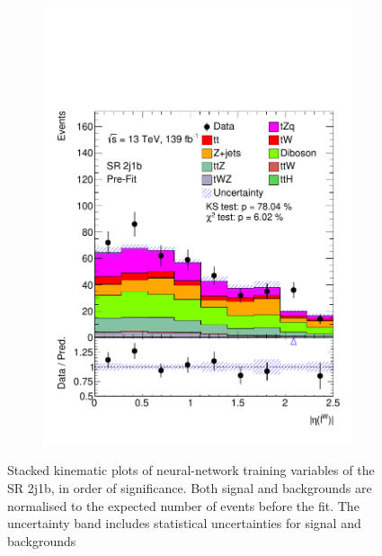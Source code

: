 \begin{figure}[!h]
\begin{subfigure}[b]{0.33\linewidth}
    \includegraphics[width=\linewidth]{ubonn-thesis/Chapters/Chapters_06/Figure/Input_distribution/SR_2j1b_lepW_eta.pdf} 
  \end{subfigure} 
  
  \caption{ Stacked kinematic plots of neural-network training variables of the SR 2j1b, in order of significance. Both signal and backgrounds are normalised to the expected number of events before the fit. The uncertainty band includes statistical uncertainties for signal and backgrounds }
  \label{fig_signal1} 
  \end{figure}


